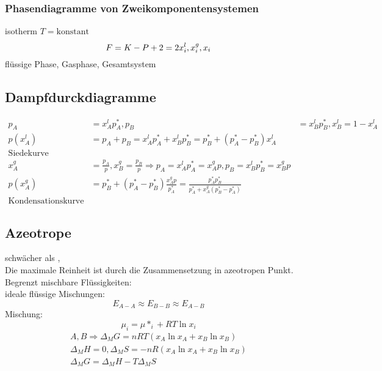 \documentclass[a4paper, fleqn]{article}
\begin{document}
\subsubsection{Phasendiagramme von Zweikomponentensystemen}
isotherm $T = \mathrm{konstant}$\\
\begin{equation*}
    F = K-P+2 = 2\\
    x_i^l, x_i^g, x_i
\end{equation*}
flüssige Phase, Gasphase, Gesamtsystem\\
\subsection{Dampfdurckdiagramme}
\begin{align*}
    p_A &= x_A^l p^*_A, p_B &= x_B^l p^*_B, x_B^l = 1- x_A^l\\
    p(x_A^l) &= p_A + p_B = x_A^lp^*_A + x_B^lp^*_B = p^*_B + (p^*_A-p^*_B)x_A^l\\
    \text{Siedekurve}\\
    x_A^g &= \frac{p_A}{p}, x_B^g = \frac{p_B}{p} \Rightarrow p_A = x_A^lp^*_A = x_A^gp , p_B = x_B^lp^*_B=x_B^gp\\
    p(x_A^g) &= p^*_B + (p^*_A - p^*_B)\frac{x_A^gp}{p^*_A} = \frac{p^*_Ap^*_B}{p^*_A+x_A^g(p^*_B-p^*_A)}\\
    \text{Kondensationskurve}
\end{align*}
\subsection{Azeotrope}
 schwächer als , \\
Die maximale Reinheit ist durch die Zusammensetzung in azeotropen Punkt.\\
Begrenzt mischbare Flüssigkeiten:\\
ideale flüssige Mischungen:
\begin{equation*}
    E_{A-A} \approx E_{B-B} \approx E_{A-B}
\end{equation*}
Mischung:
\begin{equation*}
    \mu_i = \mu*_i + RT\ln x_i
\end{equation*}
\begin{align*}
    A,B \Rightarrow \Delta_M G = nRT(x_A\ln x_A + x_B \ln x_B)\\
    \Delta_M H=0, \Delta_M S = -nR(x_A\ln x_A + x_B \ln x_B)\\
    \Delta_M G = \Delta_MH - T\Delta_MS\\  
\end{align*}
\end{document}
